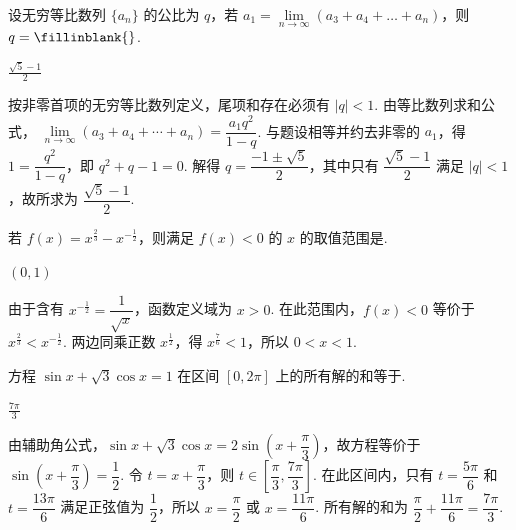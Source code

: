 \begin{problem}
设无穷等比数列 \(\{a_{n}\}\) 的公比为 \(q\)，若 \(a_{1} = \lim\limits_{n\to \infty}(a_{3} + a_{4} + \dots + a_{n})\)，则 \(q =\fillinblank{}\).

\begin{answer}
\(\frac{\sqrt{5}-1}{2}\)
\end{answer}

\begin{solution}
按非零首项的无穷等比数列定义，尾项和存在必须有 \(|q|<1\). 由等比数列求和公式，
\(\lim\limits_{n\to\infty}(a_3+a_4+\cdots+a_n)=\dfrac{a_1q^2}{1-q}\). 与题设相等并约去非零的 \(a_1\)，得 \(1=\dfrac{q^2}{1-q}\)，即 \(q^2+q-1=0\). 解得 \(q=\dfrac{-1\pm\sqrt5}{2}\)，其中只有 \(\dfrac{\sqrt5-1}{2}\) 满足 \(|q|<1\)，故所求为 \(\dfrac{\sqrt5-1}{2}\).
\end{solution}
\end{problem}

\begin{problem}
若 \( f(x) = x^{\frac{2}{3}} - x^{-\frac{1}{2}} \)，则满足 \( f(x) < 0 \) 的 \( x \) 的取值范围是\fillinblank{}.

\begin{answer}
\(\left(0,1\right)\)
\end{answer}

\begin{solution}
由于含有 \(x^{-\frac{1}{2}}=\dfrac1{\sqrt x}\)，函数定义域为 \(x>0\). 在此范围内，\(f(x)<0\) 等价于 \(x^{\frac{2}{3}}<x^{-\frac{1}{2}}\). 两边同乘正数 \(x^{\frac{1}{2}}\)，得 \(x^{\frac{7}{6}}<1\)，所以 \(0<x<1\).
\end{solution}
\end{problem}

\begin{problem}
方程 \(\sin x + \sqrt{3}\cos x = 1\) 在区间 \([0, 2\pi]\) 上的所有解的和等于\fillinblank{}.

\begin{answer}
\(\frac{7\pi}{3}\)
\end{answer}

\begin{solution}
由辅助角公式，\(\sin x+\sqrt3\cos x=2\sin\left(x+\dfrac\pi3\right)\)，故方程等价于 \(\sin\left(x+\dfrac\pi3\right)=\dfrac12\). 令 \(t=x+\dfrac\pi3\)，则 \(t\in\left[\dfrac\pi3,\dfrac{7\pi}3\right]\). 在此区间内，只有 \(t=\dfrac{5\pi}6\) 和 \(t=\dfrac{13\pi}6\) 满足正弦值为 \(\dfrac12\)，所以 \(x=\dfrac\pi2\) 或 \(x=\dfrac{11\pi}6\). 所有解的和为 \(\dfrac\pi2+\dfrac{11\pi}6=\dfrac{7\pi}3\).
\end{solution}
\end{problem}

